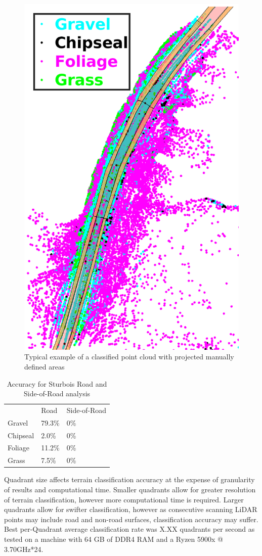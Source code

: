 \documentclass[journal,onecolumn]{IEEEtran}
\begin{document}
	\begin{figure}[H]
		\centering
		\includegraphics[width=0.45\linewidth]{figures/both_classification_things_sturbois_curve_1}
		\caption{Typical example of a classified point cloud with projected manually defined areas}
		\label{fig:Classified_PointCloud_1_ALL}
	\end{figure}
	
	\begin{table}
		\centering
		\begin{tabular}{lll}
			& Road 		& Side-of-Road 	\\
			Gravel   	& 79.3\% 	& 0\%			\\
			Chipseal 	& 2.0\% 	& 0\%  			\\
			Foliage  	& 11.2\% 	& 0\% 			\\
			Grass    	& 7.5\% 	& 0\%
		\end{tabular}
		\caption[Sturbois Road Curve Example 1]{Accuracy for Sturbois Road and Side-of-Road analysis}
		\label{tab:Sturbois_Curve_1_Road_Results}
	\end{table}

	{Quadrant size affects terrain classification accuracy at the expense of granularity of results and computational time. Smaller quadrants allow for greater resolution of terrain classification, however more computational time is required. Larger quadrants allow for swifter classification, however as consecutive scanning LiDAR points may include road and non-road surfaces, classification accuracy may suffer. Best per-Quadrant average classification rate was X.XX quadrants per second as tested on a machine with 64 GB of DDR4 RAM and a Ryzen 5900x @ 3.70GHz*24.}
\end{document}
